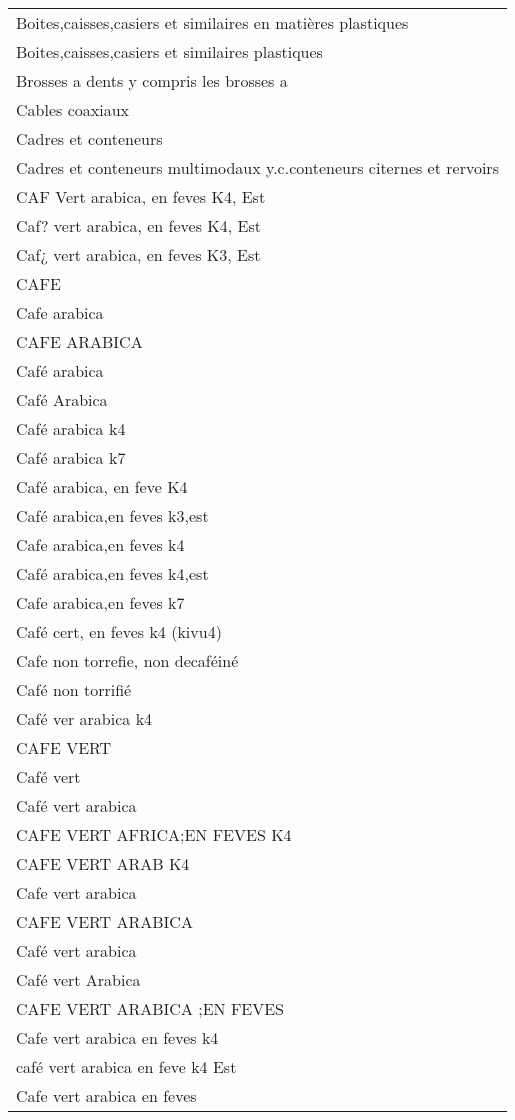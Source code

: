 \documentclass[
]{book}
\begin{document}
\begin{longtable}[t]{l}
Boites,caisses,casiers et similaires en matières plastiques\\
Boites,caisses,casiers et similaires plastiques\\
Brosses a dents y compris les brosses a\\
Cables coaxiaux\\
\addlinespace
Cadres et conteneurs\\
Cadres et conteneurs multimodaux y.c.conteneurs citernes et rervoirs\\
CAF Vert arabica, en feves K4, Est\\
Caf? vert arabica, en feves K4, Est\\
Caf¿ vert arabica, en feves K3, Est\\
\addlinespace
CAFE\\
Cafe arabica\\
CAFE ARABICA\\
Café arabica\\
Café Arabica\\
\addlinespace
Café arabica k4\\
Café arabica k7\\
Café arabica, en feve K4\\
Café arabica,en feves k3,est\\
Cafe arabica,en feves k4\\
\addlinespace
Café arabica,en feves k4,est\\
Cafe arabica,en feves k7\\
Café cert, en feves k4 (kivu4)\\
Cafe non torrefie, non decaféiné\\
Café non torrifié\\
\addlinespace
Café ver arabica k4\\
CAFE VERT\\
Café vert\\
Café vert  arabica\\
CAFE VERT AFRICA;EN FEVES K4\\
\addlinespace
CAFE VERT ARAB K4\\
Cafe vert arabica\\
CAFE VERT ARABICA\\
Café vert arabica\\
Café vert Arabica\\
\addlinespace
CAFE VERT ARABICA ;EN FEVES\\
Cafe vert arabica en  feves k4\\
café vert arabica en feve k4 Est\\
Cafe vert arabica en feves\\

\end{longtable}
\end{document}
